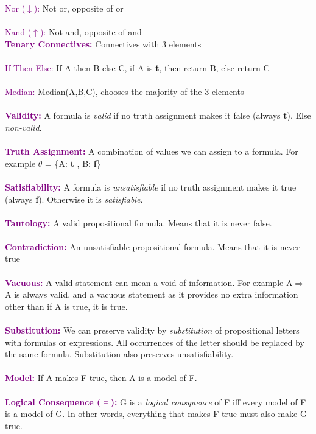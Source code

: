 \documentclass[a4paper,10pt]{article}
\begin{document}
\indent \textcolor{Purple}{Nor ($\downarrow$):} Not or, opposite of or \\ \\
\indent \textcolor{Purple}{Nand ($\uparrow$):} Not and, opposite of and \\

\noindent \textcolor{Purple}{\textbf{Tenary Connectives:}} Connectives with 3 elements \\ \\
\indent \textcolor{Purple}{If Then Else:} If A then B else C, if A is \textbf{t}, then return B, else return C\\ \\
\indent \textcolor{Purple}{Median:} Median(A,B,C), chooses the majority of the 3 elements \\ \\

\noindent \textcolor{Purple}{\textbf{Validity:}} A formula is \emph{valid} if no truth assignment makes it false (always \textbf{t}). Else \emph{non-valid}. \\ \\
\textcolor{Purple}{\textbf{Truth Assignment:}} A combination of values we can assign to a formula. For example $\theta$ = \{A: \textbf{t} , B: \textbf{f}\} \\\\
\textcolor{Purple}{\textbf{Satisfiability:}} A formula is \emph{unsatisfiable} if no truth assignment makes it true (always \textbf{f}). Otherwise it is \emph{satisfiable}.\\ \\
\textcolor{Purple}{\textbf{Tautology:}} A valid propositional formula. Means that it is never false.\\ \\
\textcolor{Purple}{\textbf{Contradiction:}} An unsatisfiable propositional formula. Means that it is never true\\ \\
\textcolor{Purple}{\textbf{Vacuous:}} A valid statement can mean a void of information. For example A$\Rightarrow$A is always valid, and a vacuous statement as it provides no extra information other than if A is true, it is true. \\ \\
\textcolor{Purple}{\textbf{Substitution:}} We can preserve validity by \emph{substitution} of propositional letters with formulas or expressions. All occurrences of the letter should be replaced by the same formula. Substitution also preserves unsatisfiability.\\ \\
\textcolor{Purple}{\textbf{Model:}} If A makes F true, then A is a model of F. \\ \\
\newpage
\noindent \textcolor{Purple}{\textbf{Logical Consequence ($\models$):}} G is a \emph{logical consquence} of F iff every model of F is a model of G. In other words, everything that makes F true must also make G true.  \\ 
\end{document}
